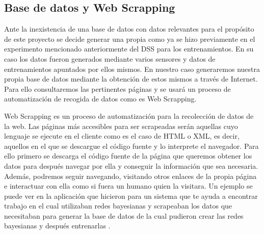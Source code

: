 \subsection{Base de datos y Web Scrapping}
Ante la inexistencia de una base de datos con datos relevantes para el propósito de este proyecto
 se decide generar una propia como ya se hizo previamente en el experimento mencionado anteriormente
 del \acs{DSS} para los entrenamientos. En su caso los datos fueron generados mediante varios sensores y
 datos de entrenamientos apuntados por ellos mismos. En nuestro caso generaremos nuestra propia
 base de datos mediante la obtención de estos mismos a través de Internet. Para ello consultaremos
 las pertinentes páginas y se usará un proceso de automatización de recogida de datos como es
 Web Scrapping.

Web Scrapping es un proceso de automatización para la recolección de datos de la web. Las páginas
 más accesibles para ser scrapeadas serán aquellas cuyo lenguaje se ejecute en el cliente como
 es el caso de HTML o XML, es decir, aquellos en el que se descargue el código fuente y lo interprete
 el navegador. Para ello primero se descarga el código fuente de la página que queremos
 obtener los datos para después navegar por ella y conseguir la información que sea necesaria.
 Además, podremos seguir navegando, visitando otros enlaces de la propia página e interactuar
 con ella como si fuera un humano quien la visitara. Un ejemplo se puede
 ver en la aplicación que hicieron para un sistema que te ayuda a encontrar trabajo en el cual
 utilizaban redes bayesianas y scrapeaban los datos que necesitaban para generar la base de datos
 de la cual pudieron crear las redes bayesianas y después entrenarlas \cite{bayesian}.
